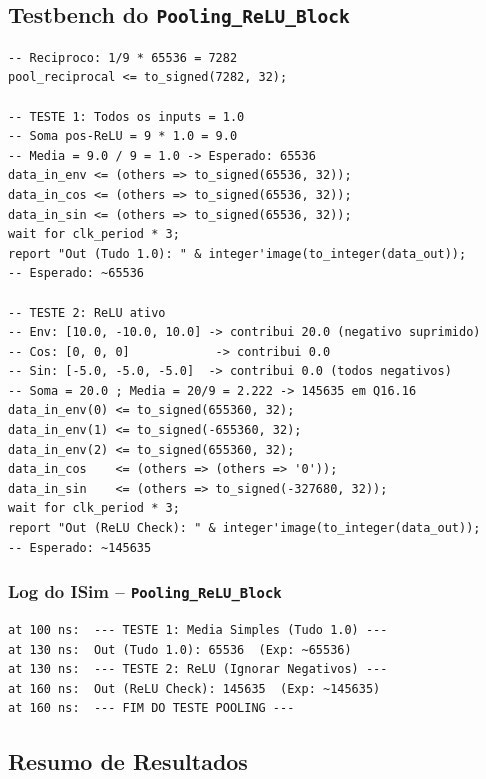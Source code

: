 \documentclass[a4paper,12pt]{article}
\begin{document}
\subsection{Testbench do \texttt{Pooling\_ReLU\_Block}}

\begin{lstlisting}[style=vhdlstyle,
    caption={Testbench do \texttt{Pooling\_ReLU\_Block}.},
    label={lst:tb_pool}]
-- Reciproco: 1/9 * 65536 = 7282
pool_reciprocal <= to_signed(7282, 32);

-- TESTE 1: Todos os inputs = 1.0
-- Soma pos-ReLU = 9 * 1.0 = 9.0
-- Media = 9.0 / 9 = 1.0 -> Esperado: 65536
data_in_env <= (others => to_signed(65536, 32));
data_in_cos <= (others => to_signed(65536, 32));
data_in_sin <= (others => to_signed(65536, 32));
wait for clk_period * 3;
report "Out (Tudo 1.0): " & integer'image(to_integer(data_out));
-- Esperado: ~65536

-- TESTE 2: ReLU ativo
-- Env: [10.0, -10.0, 10.0] -> contribui 20.0 (negativo suprimido)
-- Cos: [0, 0, 0]            -> contribui 0.0
-- Sin: [-5.0, -5.0, -5.0]  -> contribui 0.0 (todos negativos)
-- Soma = 20.0 ; Media = 20/9 = 2.222 -> 145635 em Q16.16
data_in_env(0) <= to_signed(655360, 32);
data_in_env(1) <= to_signed(-655360, 32);
data_in_env(2) <= to_signed(655360, 32);
data_in_cos    <= (others => (others => '0'));
data_in_sin    <= (others => to_signed(-327680, 32));
wait for clk_period * 3;
report "Out (ReLU Check): " & integer'image(to_integer(data_out));
-- Esperado: ~145635
\end{lstlisting}

\subsubsection{Log do ISim -- \texttt{Pooling\_ReLU\_Block}}

\begin{lstlisting}[style=logstyle,
    caption={Sa\'ida do ISim para o testbench do \texttt{Pooling\_ReLU\_Block}.},
    label={lst:log_pool}]
at 100 ns:  --- TESTE 1: Media Simples (Tudo 1.0) ---
at 130 ns:  Out (Tudo 1.0): 65536  (Exp: ~65536)
at 130 ns:  --- TESTE 2: ReLU (Ignorar Negativos) ---
at 160 ns:  Out (ReLU Check): 145635  (Exp: ~145635)
at 160 ns:  --- FIM DO TESTE POOLING ---
\end{lstlisting}

\subsection{Resumo de Resultados}
\end{document}
